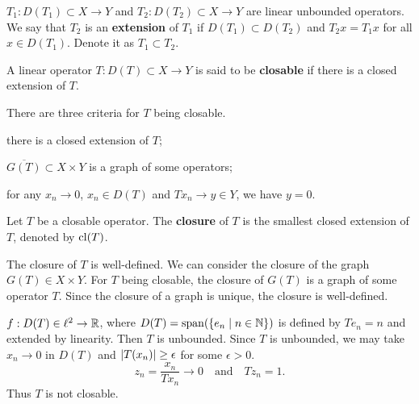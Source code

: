 \begin{definition}
    $T_1:D(T_1)\subset X\to Y$ and $T_2:D(T_2)\subset X\to Y$ are 
    linear unbounded operators. We say that $T_2$ is an \textbf{extension} 
    of $T_1$ if $D(T_1)\subset D(T_2)$ and $T_2x = T_1x$ for all 
    $x\in D(T_1)$. Denote it as $T_1\subset T_2$.
\end{definition}

\begin{definition}
    A linear operator $T:D(T)\subset X\to Y$ is said to be 
    \textbf{closable} if there is a closed extension of $T$. 
\end{definition}
\begin{remark}
    There are three criteria for $T$ being closable. 
    \begin{thmenum}
        \item there is a closed extension of $T$; 
        \item $\overline{G(T)}\subset X\times Y$ is a graph of some operators; 
        \item for any $x_n\to 0$, $x_n\in D(T)$ and $Tx_n\to y\in Y$, we have 
        $y = 0$.
    \end{thmenum}
\end{remark}

\begin{definition}
    Let $T$ be a closable operator. The \textbf{closure} of $T$ 
    is the smallest closed extension of $T$, denoted by $\operatorname{cl}(T)$.
\end{definition}
\begin{remark}
    The closure of $T$ is well-defined. We can consider the 
    closure of the graph $G(T)\in X\times Y$. For $T$ being 
    closable, the closure of $G(T)$ is a graph of some operator 
    $T$. Since the closure of a graph is unique, the closure is 
    well-defined. 
\end{remark}

\begin{example}
    $f:D(T)\in\ell^2\to\mathbb{R}$, where $D(T) = \operatorname{span}(\left\{ e_n \;\middle\vert\; n\in\mathbb{N} \right\})$ 
    is defined by $Te_n = n$ and extended by linearity. Then 
    $T$ is unbounded. Since $T$ is unbounded, we may take 
    $x_n\to 0$ in $D(T)$ and $\left\lvert {T(x_n)} \right\rvert\geq \epsilon$ for some 
    $\epsilon>0$. 
    \begin{equation*}
        z_n = \frac{x_n}{Tx_n}\to 0\quad\text{and}\quad 
        Tz_n = 1.
    \end{equation*}
    Thus $T$ is not closable.
\end{example}


